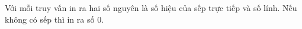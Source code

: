 Với mỗi truy vấn in ra hai số nguyên là số hiệu của sếp trực tiếp và số lính. Nếu không có sếp thì in ra số 0.  

\